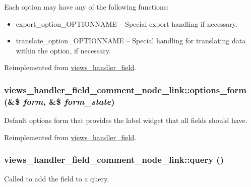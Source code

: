  Each option may have any of the following functions:\begin{itemize}
\item export\_\-option\_\-OPTIONNAME -- Special export handling if necessary.\item translate\_\-option\_\-OPTIONNAME -- Special handling for translating data within the option, if necessary. \end{itemize}


Reimplemented from \hyperlink{classviews__handler__field_64c69a8a3697603f8283405071c25b76}{views\_\-handler\_\-field}.\hypertarget{classviews__handler__field__comment__node__link_4a4be3287da8267b5571d1fe404f9070}{
\subsubsection[{options\_\-form}]{\setlength{\rightskip}{0pt plus 5cm}views\_\-handler\_\-field\_\-comment\_\-node\_\-link::options\_\-form (\&\$ {\em form}, \/  \&\$ {\em form\_\-state})}}
\label{classviews__handler__field__comment__node__link_4a4be3287da8267b5571d1fe404f9070}


Default options form that provides the label widget that all fields should have. 

Reimplemented from \hyperlink{classviews__handler__field_0435d161922b7b4b84f02a2e79bb947a}{views\_\-handler\_\-field}.\hypertarget{classviews__handler__field__comment__node__link_f48614fab00f4f6b8ec7e68a3d352b20}{
\subsubsection[{query}]{\setlength{\rightskip}{0pt plus 5cm}views\_\-handler\_\-field\_\-comment\_\-node\_\-link::query ()}}
\label{classviews__handler__field__comment__node__link_f48614fab00f4f6b8ec7e68a3d352b20}


Called to add the field to a query. 

